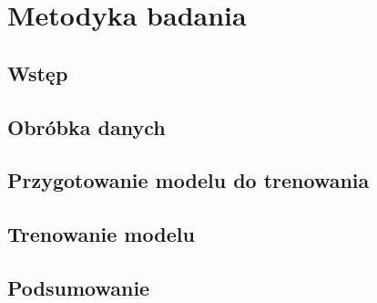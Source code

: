 
\def\filename{rozdzial4}
\chapter{Metodyka badania}

\section{Wstęp}

\section{Obróbka danych}

\section{Przygotowanie modelu do trenowania}

\section{Trenowanie modelu}

\section{Podsumowanie}